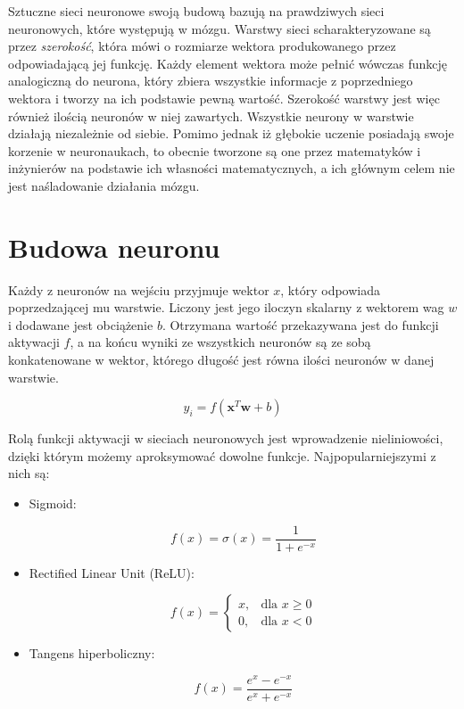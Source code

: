\documentclass[licencjacka]{pracamgr}
\begin{document}
Sztuczne sieci neuronowe swoją budową bazują na prawdziwych sieci neuronowych, które występują w mózgu. Warstwy sieci scharakteryzowane są przez \emph{szerokość}, która mówi o rozmiarze wektora produkowanego przez odpowiadającą jej funkcję. Każdy element wektora może pełnić wówczas funkcję analogiczną do neurona, który zbiera wszystkie informacje z poprzedniego wektora i tworzy na ich podstawie pewną wartość. Szerokość warstwy jest więc również ilością neuronów w niej zawartych. Wszystkie neurony w warstwie działają niezależnie od siebie. Pomimo jednak iż głębokie uczenie posiadają swoje korzenie w neuronaukach, to obecnie tworzone są one przez matematyków i inżynierów na podstawie ich własności matematycznych, a ich głównym celem nie jest naśladowanie działania mózgu.

\section{Budowa neuronu}

Każdy z neuronów na wejściu przyjmuje wektor $x$, który odpowiada poprzedzającej mu warstwie. Liczony jest jego iloczyn skalarny z wektorem wag $w$ i dodawane jest obciążenie $b$. Otrzymana wartość przekazywana jest do funkcji aktywacji $f$, a na końcu wyniki ze wszystkich neuronów są ze sobą konkatenowane w wektor, którego długość jest równa ilości neuronów w danej warstwie.

$$ y_i = f(\mathbf{x}^{T}\mathbf{w} + b) $$

Rolą funkcji aktywacji \cite{relu, activation-fn} w sieciach neuronowych jest wprowadzenie nieliniowości, dzięki którym możemy aproksymować dowolne funkcje. Najpopularniejszymi z nich są:

\begin{itemize}
\item Sigmoid:

$$ f(x) = \sigma(x) = \frac{1}{1 + e^{-x}}$$

\item Rectified Linear Unit (ReLU):

$$ f(x) = 
\begin{cases}
    x,              & \text{dla } x \geq 0\\
    0,              & \text{dla } x < 0
\end{cases}
$$

\item Tangens hiperboliczny:

$$ f(x) = \frac{e^x - e^{-x}}{e^x + e^{-x}} $$

\end{itemize}
\end{document}
